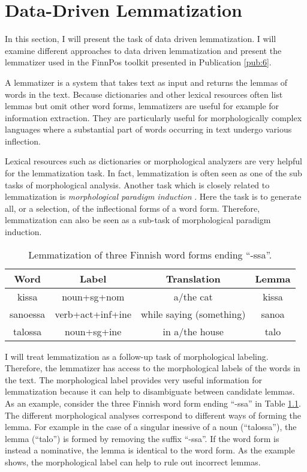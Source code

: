 \chapter{Data-Driven Lemmatization}
\label{chapter:lemmatization}

In this section, I will present the task of data driven
lemmatization. I will examine different approaches to data driven
lemmatization and present the lemmatizer used in the FinnPos toolkit
presented in Publication \ref{pub:6}.

A lemmatizer is a system that takes text as input and returns the
lemmas of words in the text. Because dictionaries and other lexical
resources often list lemmas but omit other word forms, lemmatizers are
useful for example for information extraction. They are particularly
useful for morphologically complex languages where a substantial part of
words occurring in text undergo various inflection.

Lexical resources such as dictionaries or morphological analyzers are
very helpful for the lemmatization task. In fact, lemmatization is
often seen as one of the sub tasks of morphological analysis. Another
task which is closely related to lemmatization is {\it morphological
  paradigm induction} \citep{Ahlberg2014}. Here the task is to
generate all, or a selection, of the inflectional forms of a word
form. Therefore, lemmatization can also be seen as a sub-task of
morphological paradigm induction.

\begin{table}[!htb]
\begin{center}
\begin{tabular}{cccc}
Word & Label & Translation & Lemma  \\
\hline
kissa & noun+sg+nom & a/the cat & kissa \\
sanoessa & verb+act+inf+ine & while saying (something) & sanoa \\
talossa & noun+sg+ine & in a/the house & talo
\end{tabular}
\caption{Lemmatization of three Finnish word forms ending ``-ssa''.}\label{tab:3wf}
\end{center}
\end{table}

I will treat lemmatization as a follow-up task of morphological
labeling. Therefore, the lemmatizer has access to the morphological
labels of the words in the text. The morphological label provides very
useful information for lemmatization because it can help to
disambiguate between candidate lemmas. As an example, consider the
three Finnish word form ending ``-ssa'' in Table \ref{tab:3wf}. The
different morphological analyses correspond to different ways of
forming the lemma. For example in the case of a singular inessive of a
noun (``talossa''), the lemma (``talo'') is formed by removing the
suffix ``-ssa''. If the word form is instead a nominative, the lemma
is identical to the word form. As the example shows, the morphological
label can help to rule out incorrect lemmas.

